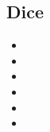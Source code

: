 \subsection{Dice}

\begin{itemize}
	\item \glyphdemo{\diceOne}
	\item \glyphdemo{\diceTwo}
	\item \glyphdemo{\diceThree}
	\item \glyphdemo{\diceFour}
	\item \glyphdemo{\diceFive}
	\item \glyphdemo{\diceSix}
\end{itemize}

\newpage
